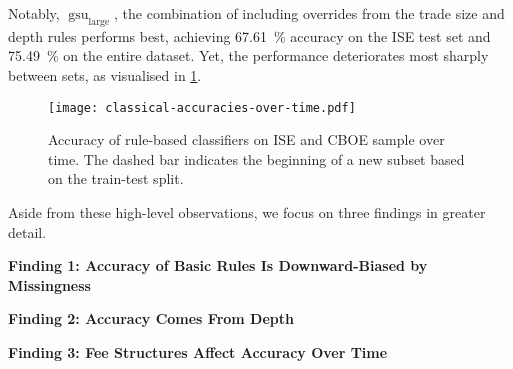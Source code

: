 Notably, $\operatorname{gsu}_{\mathrm{large}}$, the combination of \textcite[][33]{grauerOptionTradeClassification2022} including overrides from the trade size and depth rules performs best, achieving \SI{67.61}{\percent} accuracy on the \gls{ISE} test set and \SI{75.49}{\percent} on the entire dataset. Yet, the performance deteriorates most sharply between sets, as visualised in \cref{fig:classical-accuracies-over-time}.

\begin{figure}[ht]
    \centering
    \texttt{[image: classical-accuracies-over-time.pdf]}
    \caption[Accuracy Of Rule-Based Classifiers On  and  Over Time]{Accuracy of rule-based classifiers on \gls{ISE} and \gls{CBOE} sample over time. The dashed bar \myline{} indicates the beginning of a new subset based on the train-test split.}
    \label{fig:classical-accuracies-over-time}
\end{figure}

Aside from these high-level observations, we focus on three findings in greater detail.

\textbf{Finding 1: Accuracy of Basic Rules Is Downward-Biased by Missingness}

\textbf{Finding 2: Accuracy Comes From Depth}

\textbf{Finding 3: Fee Structures Affect Accuracy Over Time}

